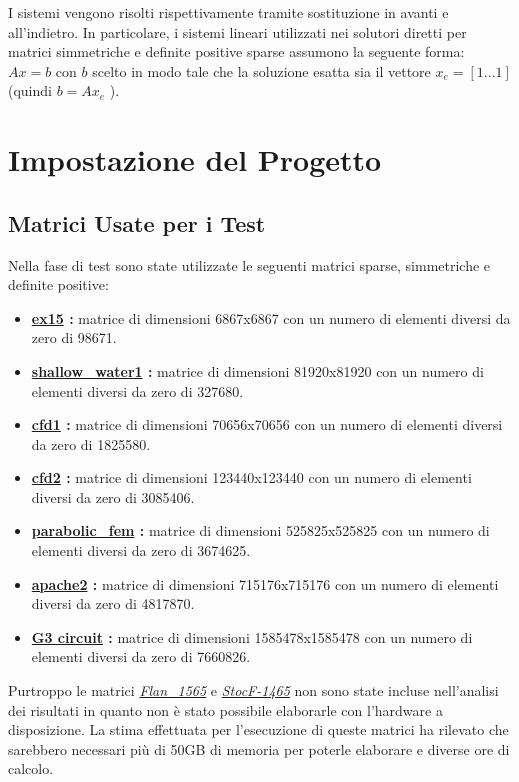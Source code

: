 \documentclass[a4paper,12pt,titlepage,oneside]{book}
\begin{document}
I sistemi vengono risolti rispettivamente tramite sostituzione in avanti e all’indietro. In particolare, i sistemi lineari utilizzati nei solutori diretti per matrici simmetriche e definite positive sparse assumono la seguente forma: $Ax = b$ con $b$ scelto in modo tale che la soluzione esatta sia il vettore $x_e = [1 . . . 1]$ (quindi $b = Ax_e$ ).


\chapter{Impostazione del Progetto}
    \section{Matrici Usate per i Test}
    \noindent Nella fase di test sono state utilizzate le seguenti matrici sparse, simmetriche e definite positive:
    \begin{itemize}
        \item{\textbf{\href{https://sparse.tamu.edu/FIDAP/ex15}{ex15} :}} matrice di dimensioni 6867x6867 con un numero di elementi diversi da zero di 98671.

        \item{\textbf{\href{https://sparse.tamu.edu/MaxPlanck/shallow_water1}{shallow\_water1} :}} matrice di dimensioni 81920x81920 con un numero di elementi diversi da zero di 327680.
        
        \item{\textbf{\href{https://sparse.tamu.edu/Rothberg/cfd1}{cfd1} :}} matrice di dimensioni 70656x70656 con un numero di elementi diversi da zero di 1825580.
        
        \item{\textbf{\href{https://sparse.tamu.edu/Rothberg/cfd2}{cfd2} :}} matrice di dimensioni 123440x123440 con un numero di elementi diversi da zero di 3085406.
        
        \item{\textbf{\href{https://sparse.tamu.edu/Wissgott/parabolic_fem}{parabolic\_fem} :}} matrice di dimensioni 525825x525825 con un numero di elementi diversi da zero di 3674625.
        
        \item{\textbf{\href{https://sparse.tamu.edu/GHS_psdef/apache2}{apache2} :}} matrice di dimensioni 715176x715176 con un numero di elementi diversi da zero di 4817870.
        
        \item{\textbf{\href{https://sparse.tamu.edu/AMD/G3_circuit}{G3 circuit} :}} matrice di dimensioni 1585478x1585478 con un numero di elementi diversi da zero di 7660826.
    \end{itemize}
    \noindent Purtroppo le matrici \textit{\href{https://sparse.tamu.edu/Janna/Flan_1565}{Flan\_1565}} e \textit{\href{https://sparse.tamu.edu/Janna/StocF-1465}{StocF-1465}} non sono state incluse nell'analisi dei risultati in quanto non è stato possibile elaborarle con l'hardware a disposizione. La stima effettuata per l'esecuzione di queste matrici ha rilevato che sarebbero necessari più di 50GB di memoria per poterle elaborare e diverse ore di calcolo.
    
\end{document}
